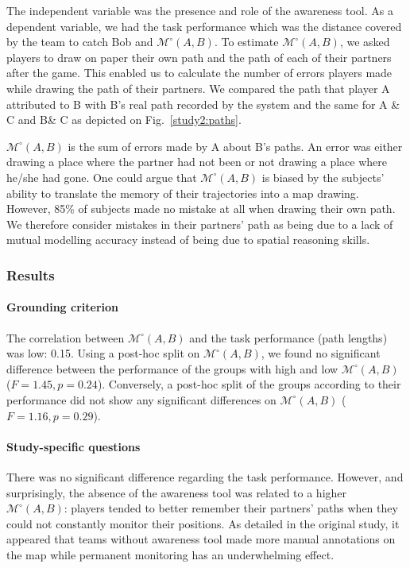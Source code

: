 \documentclass[natbib]{svjour3}
\newcommand{\A}{A\xspace}
\newcommand{\B}{B\xspace}
\newcommand{\C}{C\xspace}
\newcommand{\gModel}[2]{{$\mathcal{M}^{\circ}(#1, #2)$}}
\begin{document}
The independent variable was the presence and role of the awareness tool. As a
dependent variable, we had the task performance which was the distance covered
by the team to catch Bob and \gModel{A}{B}. To estimate \gModel{A}{B}, we asked
players to draw on paper their own path and the path of each of their partners
after the game. This enabled us to calculate the number of errors players made
while drawing the path of their partners. We compared the path that player \A
attributed to \B with \B's real path recorded by the system and the same for \A
\& \C and \B \& \C as depicted on Fig.~\ref{study2:paths}. 

\gModel{A}{B} is the sum of errors made by \A about \B's paths. An error was
either drawing a place where the partner had not been or not drawing a place
where he/she had gone. One could argue that \gModel{A}{B} is biased by the
subjects' ability to translate the memory of their trajectories into a map drawing.
However, 85\% of subjects made no mistake at all when drawing their own path.
We therefore consider mistakes in their partners' path as being due to a lack
of mutual modelling accuracy instead of being due to spatial reasoning skills.

\subsubsection*{Results}

\paragraph{Grounding criterion} The correlation between \gModel{A}{B} and the
task performance (path lengths) was low: 0.15. Using a post-hoc split on
\gModel{A}{B}, we found no significant difference between the performance of the
groups with high and low \gModel{A}{B}  ($F = 1.45, p = 0.24$). Conversely, a
post-hoc split of the groups according to their performance did not show
any significant differences on \gModel{A}{B} ($F = 1.16, p = 0.29$).

\paragraph{Study-specific questions} There was no significant difference
regarding the task performance. However, and surprisingly, the absence of the
awareness tool was related to a higher \gModel{A}{B}: players tended to better
remember their partners' paths when they could not constantly monitor their
positions. As detailed in the original study, it
appeared that teams without awareness tool made more manual annotations on the
map while permanent monitoring has an underwhelming effect.
\end{document}

